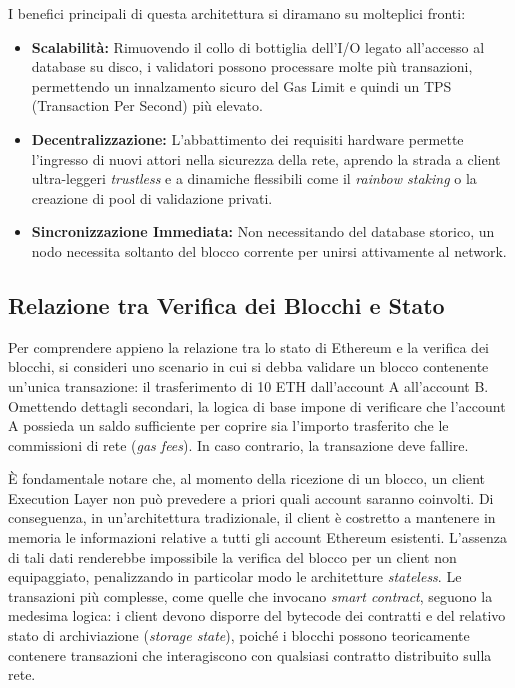 \documentclass[12pt,a4paper,openright,twoside]{report}
\begin{document}
I benefici principali di questa architettura si diramano su molteplici fronti:
\begin{itemize}
    \item \textbf{Scalabilità:} Rimuovendo il collo di bottiglia dell'I/O legato all'accesso al database su disco, i validatori possono processare molte più transazioni, permettendo un innalzamento sicuro del Gas Limit e quindi un TPS (Transaction Per Second) più elevato.
    \item \textbf{Decentralizzazione:} L'abbattimento dei requisiti hardware permette l'ingresso di nuovi attori nella sicurezza della rete, aprendo la strada a client ultra-leggeri \textit{trustless} e a dinamiche flessibili come il \textit{rainbow staking} o la creazione di pool di validazione privati.
    \item \textbf{Sincronizzazione Immediata:} Non necessitando del database storico, un nodo necessita soltanto del blocco corrente per unirsi attivamente al network.
\end{itemize}

\subsection{Relazione tra Verifica dei Blocchi e Stato}
Per comprendere appieno la relazione tra lo stato di Ethereum e la verifica dei blocchi, si consideri uno scenario in cui si debba validare un blocco contenente un'unica transazione: il trasferimento di 10 ETH dall'account A all'account B. Omettendo dettagli secondari, la logica di base impone di verificare che l'account A possieda un saldo sufficiente per coprire sia l'importo trasferito che le commissioni di rete (\textit{gas fees}). In caso contrario, la transazione deve fallire.

È fondamentale notare che, al momento della ricezione di un blocco, un client Execution Layer non può prevedere a priori quali account saranno coinvolti. Di conseguenza, in un'architettura tradizionale, il client è costretto a mantenere in memoria le informazioni relative a tutti gli account Ethereum esistenti. L'assenza di tali dati renderebbe impossibile la verifica del blocco per un client non equipaggiato, penalizzando in particolar modo le architetture \textit{stateless}. Le transazioni più complesse, come quelle che invocano \textit{smart contract}, seguono la medesima logica: i client devono disporre del bytecode dei contratti e del relativo stato di archiviazione (\textit{storage state}), poiché i blocchi possono teoricamente contenere transazioni che interagiscono con qualsiasi contratto distribuito sulla rete.
\end{document}

